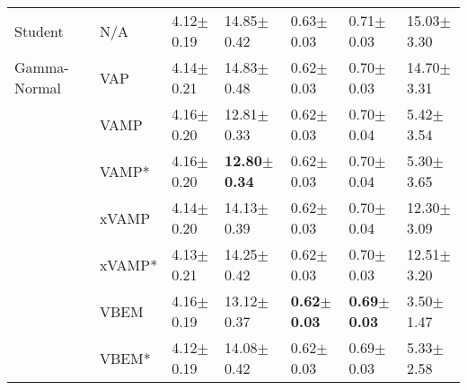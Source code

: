 \begin{tabular}{lllllll}
Student & N/A &           4.12$\pm$0.19 &           14.85$\pm$0.42 &           0.63$\pm$0.03 &           0.71$\pm$0.03 &          15.03$\pm$3.30 \\
Gamma-Normal & VAP &           4.14$\pm$0.21 &           14.83$\pm$0.48 &           0.62$\pm$0.03 &           0.70$\pm$0.03 &          14.70$\pm$3.31 \\
             & VAMP &           4.16$\pm$0.20 &           12.81$\pm$0.33 &           0.62$\pm$0.03 &           0.70$\pm$0.04 &           5.42$\pm$3.54 \\
             & VAMP* &           4.16$\pm$0.20 &  \textbf{12.80$\pm$0.34} &           0.62$\pm$0.03 &           0.70$\pm$0.04 &           5.30$\pm$3.65 \\
             & xVAMP &           4.14$\pm$0.20 &           14.13$\pm$0.39 &           0.62$\pm$0.03 &           0.70$\pm$0.04 &          12.30$\pm$3.09 \\
             & xVAMP* &           4.13$\pm$0.21 &           14.25$\pm$0.42 &           0.62$\pm$0.03 &           0.70$\pm$0.03 &          12.51$\pm$3.20 \\
             & VBEM &           4.16$\pm$0.19 &           13.12$\pm$0.37 &  \textbf{0.62$\pm$0.03} &  \textbf{0.69$\pm$0.03} &           3.50$\pm$1.47 \\
             & VBEM* &           4.12$\pm$0.19 &           14.08$\pm$0.42 &           0.62$\pm$0.03 &           0.69$\pm$0.03 &           5.33$\pm$2.58 \\
\bottomrule
\end{tabular}

